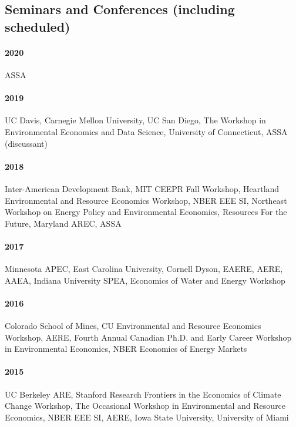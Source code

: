 \documentclass{res} %
\begin{document}
\begin{resume}
\section{Seminars and Conferences (including scheduled)}\vspace{-.1in}
\paragraph{2020} ASSA \vspace{-.3in}
\paragraph{2019} UC Davis, Carnegie Mellon University, UC San Diego, The Workshop in Environmental Economics and Data Science, University of Connecticut, ASSA (discussant) \vspace{-.3in}
\paragraph{2018} Inter-American Development Bank, MIT CEEPR Fall Workshop, Heartland Environmental and Resource Economics Workshop, NBER EEE SI, Northeast Workshop on Energy Policy and Environmental Economics, Resources For the Future, Maryland AREC, ASSA \vspace{-.3in}
\paragraph{2017} Minnesota APEC, East Carolina University, Cornell Dyson, EAERE, AERE, AAEA, Indiana University SPEA, Economics of Water and Energy Workshop \vspace{-.3in}
\paragraph{2016} Colorado School of Mines, CU Environmental and Resource Economics Workshop, AERE, Fourth Annual Canadian Ph.D. and Early Career Workshop in Environmental Economics, NBER Economics of Energy Markets \vspace{-.3in}
\paragraph{2015} UC Berkeley ARE, Stanford Research Frontiers in the Economics of Climate Change Workshop, The Occasional Workshop in Environmental and Resource Economics, NBER EEE SI, AERE, Iowa State University, University of Miami \vspace{-.3in}

\end{resume}
\end{document}

